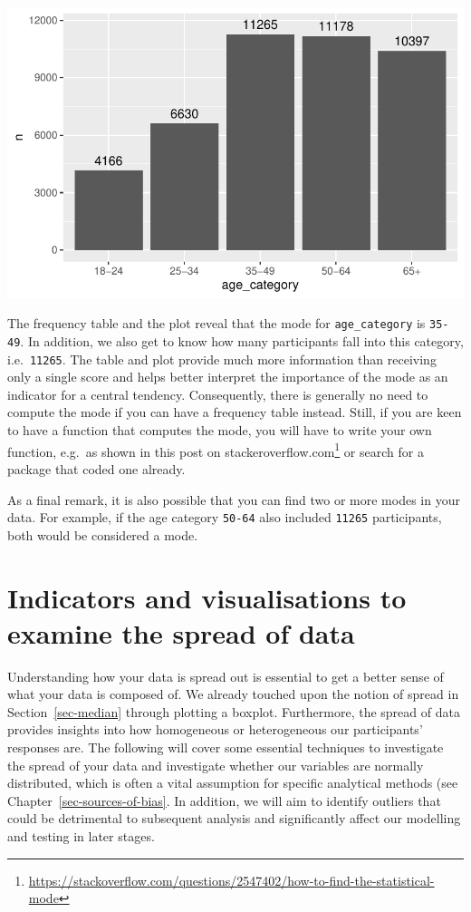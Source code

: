 \documentclass[
  letterpaper,
]{krantz}
\renewcommand{\href}[2]{#2\footnote{\url{#1}}}
\begin{document}
\includegraphics{08_descriptive_statistics_files/figure-latex/mode-visualised-as-freq-table-1.pdf}

The frequency table and the plot reveal that the mode for
\texttt{age\_category} is \texttt{35-49}. In addition, we also get to
know how many participants fall into this category, i.e.~\texttt{11265}.
The table and plot provide much more information than receiving only a
single score and helps better interpret the importance of the mode as an
indicator for a central tendency. Consequently, there is generally no
need to compute the mode if you can have a frequency table instead.
Still, if you are keen to have a function that computes the mode, you
will have to write your own function, e.g.~as shown in this post on
\href{https://stackoverflow.com/questions/2547402/how-to-find-the-statistical-mode}{stackeroverflow.com}
or search for a package that coded one already.

As a final remark, it is also possible that you can find two or more
modes in your data. For example, if the age category \texttt{50-64} also
included \texttt{11265} participants, both would be considered a mode.

\section{Indicators and visualisations to examine the spread of
data}\label{sec-spread-of-data}

Understanding how your data is spread out is essential to get a better
sense of what your data is composed of. We already touched upon the
notion of spread in Section~\ref{sec-median} through plotting a boxplot.
Furthermore, the spread of data provides insights into how homogeneous
or heterogeneous our participants' responses are. The following will
cover some essential techniques to investigate the spread of your data
and investigate whether our variables are normally distributed, which is
often a vital assumption for specific analytical methods (see
Chapter~\ref{sec-sources-of-bias}. In addition, we will aim to identify
outliers that could be detrimental to subsequent analysis and
significantly affect our modelling and testing in later stages.
\end{document}
